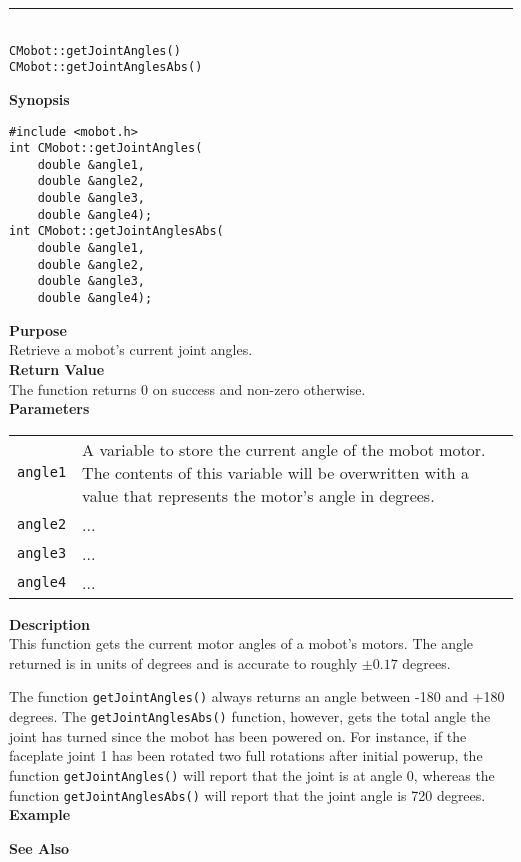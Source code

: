 \noindent
\vspace{5pt}
\rule{4.5in}{0.015in}\\
\noindent
{\LARGE \texttt{CMobot::getJointAngles()}}\\
{\LARGE \texttt{CMobot::getJointAnglesAbs()}}\\
{}

\noindent
{\bf Synopsis}
\vspace{-8pt}
\begin{verbatim}
#include <mobot.h>
int CMobot::getJointAngles(
    double &angle1,
    double &angle2,
    double &angle3,
    double &angle4);
int CMobot::getJointAnglesAbs(
    double &angle1,
    double &angle2,
    double &angle3,
    double &angle4);
\end{verbatim}

\noindent
{\bf Purpose}\\
Retrieve a mobot's current joint angles.\\

\noindent
{\bf Return Value}\\
The function returns 0 on success and non-zero otherwise.\\

\noindent
{\bf Parameters}\\
\vspace{-0.1in}
\begin{description}
\item               
\begin{tabular}{p{15 mm}p{145 mm}}
\texttt{angle1} & A variable to store the current angle of the mobot
motor. The contents of this variable will be overwritten with a value that
represents the motor's angle in degrees.  \\
\texttt{angle2} & ...  \\
\texttt{angle3} & ...  \\
\texttt{angle4} & ...  \\
\end{tabular}
\end{description}

\noindent
{\bf Description}\\
This function gets the current motor angles of a mobot's motors. The
angle returned is in units of degrees and is accurate to roughly $\pm0.17$
degrees. 

The function \texttt{getJointAngles()} always returns an angle between -180 and
+180 degrees. The \texttt{getJointAnglesAbs()} function, however, gets the total
angle the joint has turned since the mobot has been powered on. For instance, 
if the faceplate joint 1 has been rotated two full rotations after initial powerup,
  the function \texttt{getJointAngles()} will report that the joint is at angle 0,
  whereas the function \texttt{getJointAnglesAbs()} will report that the joint
  angle is 720 degrees.
\\

\noindent
{\bf Example}\\
\noindent

\noindent
{\bf See Also}\\

